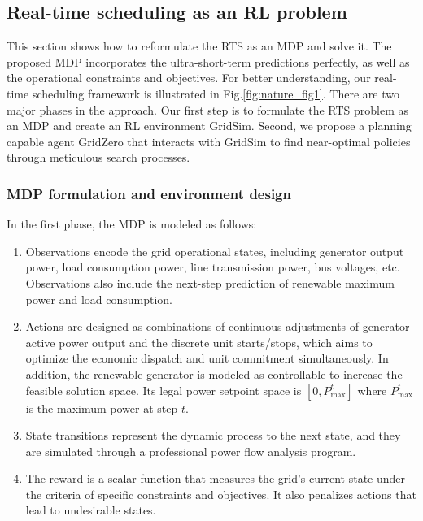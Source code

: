 \subsection*{Real-time scheduling as an RL problem}
This section shows how to reformulate the RTS as an MDP and solve it. The proposed MDP incorporates the ultra-short-term predictions perfectly, as well as the operational constraints and objectives.
For better understanding, our real-time scheduling framework is illustrated in Fig.\ref{fig:nature_fig1}. There are two major phases in the approach. Our first step is to formulate the RTS problem as an MDP and create an RL environment GridSim. Second, we propose a planning capable agent GridZero that interacts with GridSim to find near-optimal policies 
through meticulous search processes.
\subsubsection*{MDP formulation and environment design}
In the first phase, 
the MDP is modeled as follows:
\begin{enumerate}[label=(\arabic*)]
    \item Observations encode the grid operational states, including generator output power, load consumption power, line transmission power, bus voltages, etc. Observations also include the next-step prediction of renewable maximum power and load consumption.
    \item Actions are designed as combinations of continuous adjustments of generator active power output and the discrete unit starts/stops, which aims to optimize the economic dispatch and unit commitment simultaneously. In addition, the renewable generator is modeled as controllable to increase the feasible solution space. Its legal power setpoint space is $[0, P_{\text{max}}^t]$ where $P_{\text{max}}^t$ is the maximum power at step $t$. 
    \item State transitions represent the dynamic process to the next state, and they are  simulated through a professional power flow analysis program. 
    \item The reward is a scalar function that measures the grid's current state under the criteria of specific constraints and objectives. It also penalizes actions that lead to undesirable states.
\end{enumerate}

